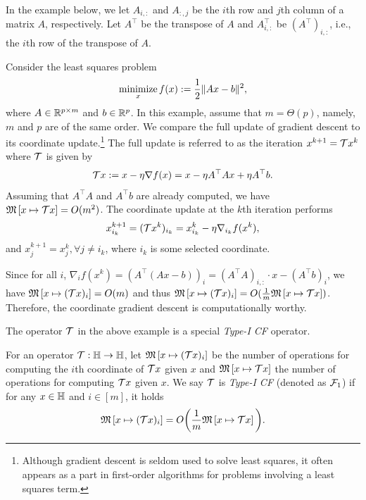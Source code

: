 In the example below,  we let $A_{i,:}$ and $A_{:,j}$ be the $i$th row and $j$th column of a matrix $A$, respectively. Let $A^\top$ be the transpose of $A$ and $A^\top_{i,:}$ be $(A^\top)_{i,:}$, i.e., the $i$th row of the transpose of $A$.

\begin{example}\label{ex:lsq1}
Consider the least squares problem
\begin{equation}
\Min_{x} f(x):=\frac{1}{2} \|A x - b\|^2,\label{lsq}
\end{equation}
where $A \in \mathbb{R}^{p \times m}$ and $b \in \mathbb{R}^p$. In this example, assume that $m=\Theta(p)$, namely, $m$ and $p$ are of the same order.  We compare the full update of gradient descent to its coordinate update.\footnote{Although gradient descent is seldom used to solve least squares, it often appears as a part in first-order algorithms for problems involving a least squares term.}
The full update is referred to as the iteration
$x^{k+1}= {\mathcal{T}} x^k $ where ${\mathcal{T}}$ is given by
\begin{equation}\label{eq:LSfull}
\cT x:=x-\eta\nabla f(x)=x-\eta A^\top Ax + \eta A^\top b.
\end{equation}
Assuming that $ A^\top A$ and $ A^\top b$ are already computed, we have $\mathfrak{M}\left[{x}\mapsto {{\mathcal{T}}x}\right]=O(m^2)$. The coordinate update at the $k$th iteration performs
$$x_{i_k}^{k+1}=({\mathcal{T}} x^k)_{i_k} =x^k_{i_k}-\eta\nabla_{i_k} f(x^k),$$
and $x_j^{k+1}=x_j^{k},\forall j\neq i_k$, where $i_k$ is some selected coordinate.

Since for all $i$, $\nabla_i f(x^k)=\left(A^\top (Ax-b)\right)_{i}=(A^\top A)_{i,:}\cdot x-(A^\top b)_{i}$,
we have $\mathfrak{M}\left[{x}\mapsto {({\mathcal{T}}x)_i }\right]=O(m)$ and thus $\mathfrak{M}\left[{x}\mapsto {({\mathcal{T}}x)_i }\right]=O(\frac{1}{m}\mathfrak{M}\left[{x}\mapsto {{\mathcal{T}}x}\right])$. Therefore, the coordinate gradient descent is computationally worthy.
\end{example}
The operator ${\mathcal{T}}$ in the above example is a special \emph{Type-I CF} operator.
\begin{definition}[Type-I CF]
For an operator ${\mathcal{T}}: \mathbb{H}\to\mathbb{H}$, let $\mathfrak{M}\left[{x}\mapsto {({\mathcal{T}}x)_i}\right]$ be the number of operations for computing the $i$th coordinate of ${\mathcal{T}} x$ given $x$ and $\mathfrak{M}\left[{x}\mapsto {{\mathcal{T}}x}\right]$ the number of operations for computing ${\mathcal{T}} x$ given $x$.
We say ${\mathcal{T}}$ is \emph{Type-I CF} (denoted as ${\mathcal{F}}_1$) if for any $x\in\mathbb{H}$ and $i\in [m]$, it holds
$$\mathfrak{M}\left[{x}\mapsto {({\mathcal{T}}x)_i}\right]= O\bigg(\frac{1}{m}\mathfrak{M}\left[{x}\mapsto {{\mathcal{T}}x}\right]\bigg).$$
\end{definition}
